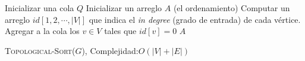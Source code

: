 

	Inicializar una cola $Q$\;
	Inicializar un arreglo $A$ (el ordenamiento)\;
	Computar un arreglo $id[1,2,\cdots ,|V|]$ que indica el \textit{in degree} (grado de entrada) de cada v\'ertice.\;
	Agregar a la cola los $v\in V$ tales que $id[v]=0$\;
	\Return $A$\;
	\caption{\textsc{Topological-Sort}($G$), Complejidad:$O(|V|+|E|)$}